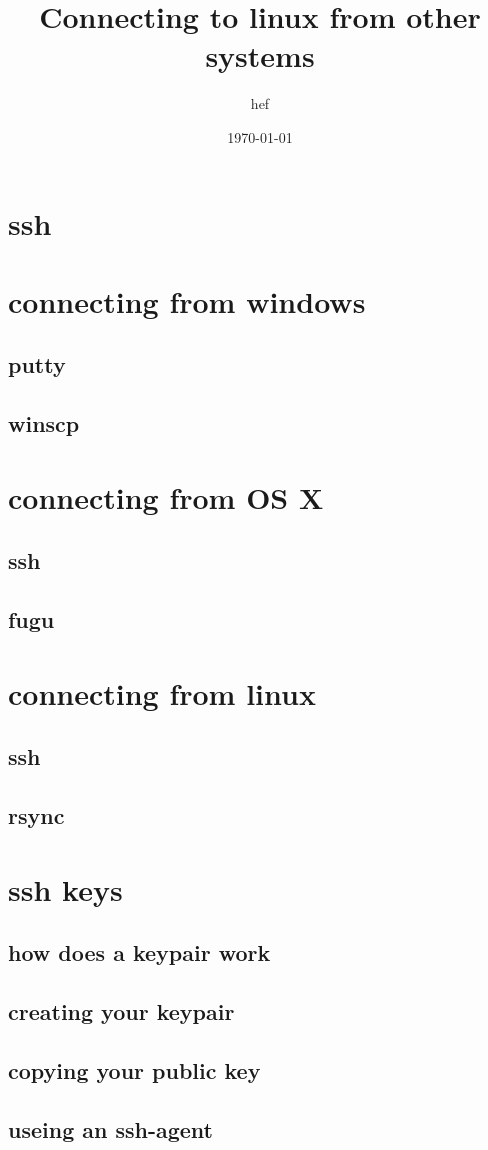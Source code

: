 \documentclass[hyperref={pdfpagelabels=false}]{beamer}
\title{Connecting to linux from other systems}
\author{hef}
\date{\today}
\begin{document}
\frame{\titlepage}
\section[outline]{}
\frame{\tableofcontents}
\section{ssh}
\section{connecting from windows}
\subsection{putty}
\subsection{winscp}
\section{connecting from OS X}
\subsection{ssh}
\subsection{fugu}
\section{connecting from linux}
\subsection{ssh}
\subsection{rsync}
\section{ssh keys}
\subsection{how does a keypair work}
\subsection{creating your keypair}
\subsection{copying your public key}
\subsection{useing an ssh-agent}
\end{document}
